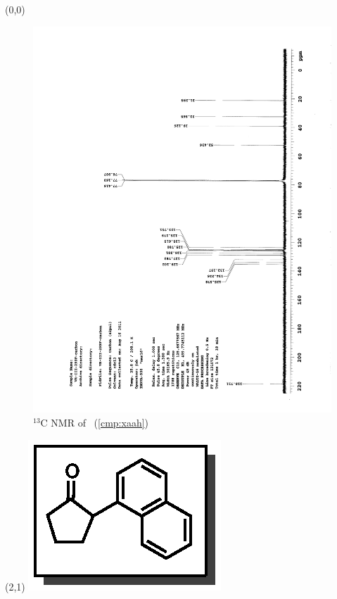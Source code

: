 \clearpage
\begin{textblock}{20}(0,0)
\begin{figure}[htb]
\caption{$^{13}$C NMR of  \CMPxaah\ (\ref{cmp:xaah})}
\includegraphics[scale=0.75, trim = 0mm 0mm 0mm 5mm,
clip]{chp_asymmetric/images/nmr/xaahC}
\vspace{-100pt}
\end{figure}
\end{textblock}
\begin{textblock}{1}(2,1)
\includegraphics[scale=0.8, angle=90]{chp_asymmetric/images/xaah}
\end{textblock}
\clearpage

